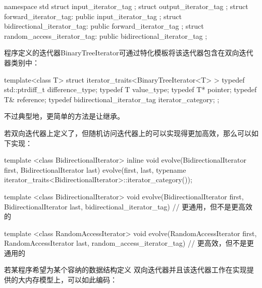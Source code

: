 \begin{codeblock}
namespace std {
  struct input_iterator_tag { };
  struct output_iterator_tag { };
  struct forward_iterator_tag: public input_iterator_tag { };
  struct bidirectional_iterator_tag: public forward_iterator_tag { };
  struct random_access_iterator_tag: public bidirectional_iterator_tag { };
}
\end{codeblock}

\pnum
{}%
%
%
%
%
%
\enterexample
程序定义的迭代器{BinaryTreeIterator}可通过特化模板将该迭代器包含在双向迭代器类别中：

\begin{codeblock}
template<class T> struct iterator_traits<BinaryTreeIterator<T> > {
  typedef std::ptrdiff_t difference_type;
  typedef T value_type;
  typedef T* pointer;
  typedef T& reference;
  typedef bidirectional_iterator_tag iterator_category;
};
\end{codeblock}

不过典型地，更简单的方法是让继承。
\exitexample

\pnum
\enterexample
若双向迭代器上定义了，但随机访问迭代器上的可以实现得更加高效，那么可以如下实现：

\begin{codeblock}
template <class BidirectionalIterator>
inline void
evolve(BidirectionalIterator first, BidirectionalIterator last) {
  evolve(first, last,
    typename iterator_traits<BidirectionalIterator>::iterator_category());
}

template <class BidirectionalIterator>
void evolve(BidirectionalIterator first, BidirectionalIterator last,
  bidirectional_iterator_tag) {
  // 更通用，但不是更高效的
}

template <class RandomAccessIterator>
void evolve(RandomAccessIterator first, RandomAccessIterator last,
  random_access_iterator_tag) {
  // 更高效，但不是更通用的
}
\end{codeblock}
\exitexample

\pnum
\enterexample
若某\Cpp 程序希望为某个容纳的数据结构定义
双向迭代器并且该迭代器工作在实现提供的大内存模型上，可以如此编码：

